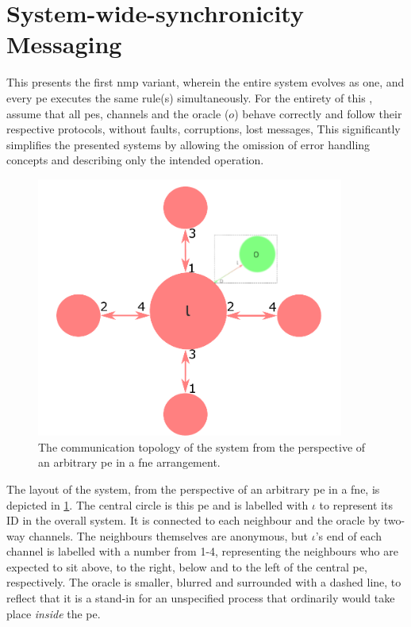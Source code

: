 \section{\label{sec:nmp:systemwide}System-wide-synchronicity Messaging}

\cpresetrulenumber

This  presents the first \gls{nmp} variant, wherein the entire system evolves as one, and every \gls{pe} executes the same rule(s) simultaneously.  For the entirety of this , assume that all \glspl{pe}, channels and the oracle (\(o\)) behave correctly and follow their respective protocols, without faults, corruptions, lost messages, \etc{}  This significantly simplifies the presented systems by allowing the omission of error handling concepts and describing only the intended operation.

\begin{figure}
    \centering
    \includegraphics[width=0.9\textwidth]{chapters/nmp/images/iota_proxels_oracle_v7.pdf}
    \caption[The communication topology of a  system from the perspective of an arbitrary  in a \gls{fne} arrangement]{The communication topology of the system from the perspective of an arbitrary \gls{pe} in a \gls{fne} arrangement.}
    \label{fig:nmp:iota_proxels_environment_oracle}
\end{figure}

The layout of the system, from the perspective of an arbitrary \gls{pe} in a \gls{fne}, is depicted in \cref{fig:nmp:iota_proxels_environment_oracle}.  The central circle is this \gls{pe} and is labelled with \(\iota\) to represent its ID in the overall system.  It is connected to each neighbour and the oracle by two-way channels.  The neighbours themselves are anonymous, but \(\iota\)'s end of each channel is labelled with a number from 1-4, representing the neighbours who are expected to sit above, to the right, below and to the left of the central \gls{pe}, respectively.  The oracle is smaller, blurred and surrounded with a dashed line, to reflect that it is a stand-in for an unspecified process that ordinarily would take place \emph{inside} the \gls{pe}.

